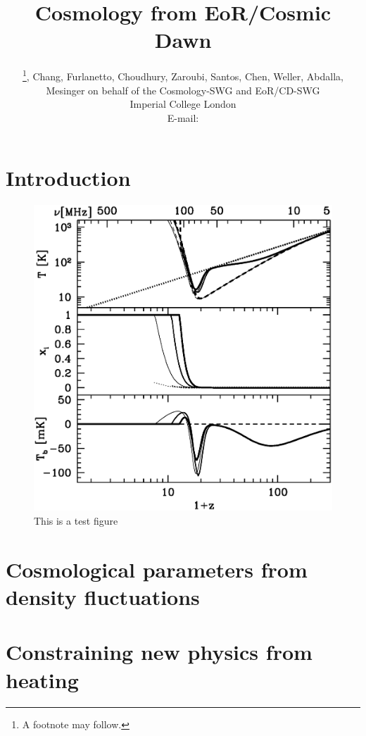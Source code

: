\documentclass{PoS}
\title{Cosmology from EoR/Cosmic Dawn}
\author{\speaker{Pritchard}\thanks{A footnote may follow.}, Chang, Furlanetto, Choudhury, Zaroubi, Santos, Chen, Weller, Abdalla, Mesinger on behalf of the Cosmology-SWG and EoR/CD-SWG\\
        Imperial College London\\
        E-mail: \email{j.pritchard@imperial.ac.uk}}
\begin{document}
\section{Introduction}

\cite{furlanetto2006dm}

\begin{figure}[htbp]
\begin{center}
\includegraphics[scale=0.3]{figures/global_signal.eps}
\caption{This is a test figure}
\label{fig:global_signal}
\end{center}
\end{figure}


\section{Cosmological parameters from density fluctuations}

\section{Constraining new physics from heating}

\end{document}
